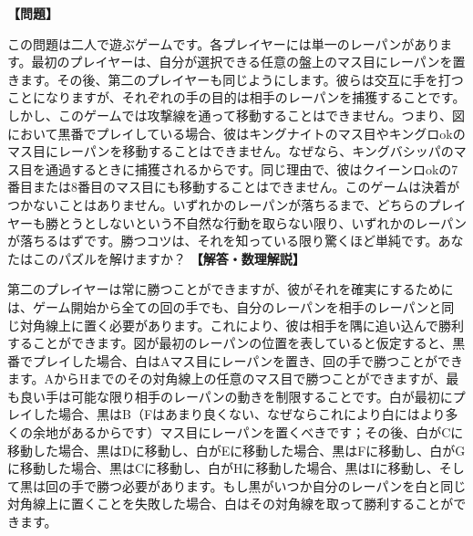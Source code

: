 \documentclass[10pt,a4paper,oneside,openany]{ltjsbook}
\begin{document}
\begin{tcolorbox}[colback=softblue,colframe=primaryblue,title=\textbf{第 393 問：二つのレーパン （原題: THE TWO ROOKS.）},arc=2mm,boxrule=1pt,breakable]
\textbf{【問題】}\par\vspace{0.3em}
この問題は二人で遊ぶゲームです。各プレイヤーには単一のレーパンがあります。最初のプレイヤーは、自分が選択できる任意の盤上のマス目にレーパンを置きます。その後、第二のプレイヤーも同じようにします。彼らは交互に手を打つことになりますが、それぞれの手の目的は相手のレーパンを捕獲することです。しかし、このゲームでは攻撃線を通って移動することはできません。つまり、図において黒番でプレイしている場合、彼はキングナイトのマス目やキングロokのマス目にレーパンを移動することはできません。なぜなら、キングバシッパのマス目を通過するときに捕獲されるからです。同じ理由で、彼はクイーンロokの7番目または8番目のマス目にも移動することはできません。このゲームは決着がつかないことはありません。いずれかのレーパンが落ちるまで、どちらのプレイヤーも勝とうとしないという不自然な行動を取らない限り、いずれかのレーパンが落ちるはずです。勝つコツは、それを知っている限り驚くほど単純です。あなたはこのパズルを解けますか？
\tcblower
\textbf{【解答・数理解説】}\par\vspace{0.3em}
第二のプレイヤーは常に勝つことができますが、彼がそれを確実にするためには、ゲーム開始から全ての回の手でも、自分のレーパンを相手のレーパンと同じ対角線上に置く必要があります。これにより、彼は相手を隅に追い込んで勝利することができます。図が最初のレーパンの位置を表していると仮定すると、黒番でプレイした場合、白はAマス目にレーパンを置き、回の手で勝つことができます。AからHまでのその対角線上の任意のマス目で勝つことができますが、最も良い手は可能な限り相手のレーパンの動きを制限することです。白が最初にプレイした場合、黒はB（Fはあまり良くない、なぜならこれにより白にはより多くの余地があるからです）マス目にレーパンを置くべきです；その後、白がCに移動した場合、黒はDに移動し、白がEに移動した場合、黒はFに移動し、白がGに移動した場合、黒はCに移動し、白がHに移動した場合、黒はIに移動し、そして黒は回の手で勝つ必要があります。もし黒がいつか自分のレーパンを白と同じ対角線上に置くことを失敗した場合、白はその対角線を取って勝利することができます。
\end{tcolorbox}
\end{document}
